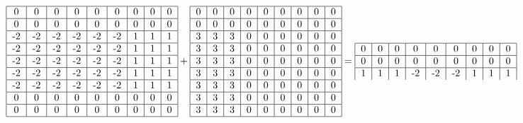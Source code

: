 \documentclass{article}
\begin{document}
\begin{equation}
    \begin{tabular}{ | c | c | c | c | c | c | c | c | c | }
        \hline
        0 & 0 & 0 & 0 & 0 & 0 & 0 & 0 & 0 \\ 
        \hline
        0 & 0 & 0 & 0 & 0 & 0 & 0 & 0 & 0 \\ 
        \hline
        -2 & -2 & -2 & -2 & -2 & -2 & 1 & 1 & 1 \\ 
        \hline
        -2 & -2 & -2 & -2 & -2 & -2 & 1 & 1 & 1 \\ 
        \hline
        -2 & -2 & -2 & -2 & -2 & -2 & 1 & 1 & 1 \\ 
        \hline
        -2 & -2 & -2 & -2 & -2 & -2 & 1 & 1 & 1 \\ 
        \hline
        -2 & -2 & -2 & -2 & -2 & -2 & 1 & 1 & 1 \\ 
        \hline
        0 & 0 & 0 & 0 & 0 & 0 & 0 & 0 & 0 \\ 
        \hline
        0 & 0 & 0 & 0 & 0 & 0 & 0 & 0 & 0 \\ 
        \hline
    \end{tabular} + 
    \begin{tabular}{ | c | c | c | c | c | c | c | c | c | }
        \hline
        0 & 0 & 0 & 0 & 0 & 0 & 0 & 0 & 0 \\ 
        \hline
        0 & 0 & 0 & 0 & 0 & 0 & 0 & 0 & 0 \\ 
        \hline
        3 & 3 & 3 & 0 & 0 & 0 & 0 & 0 & 0 \\ 
        \hline
        3 & 3 & 3 & 0 & 0 & 0 & 0 & 0 & 0 \\ 
        \hline
        3 & 3 & 3 & 0 & 0 & 0 & 0 & 0 & 0 \\ 
        \hline
        3 & 3 & 3 & 0 & 0 & 0 & 0 & 0 & 0 \\ 
        \hline
        3 & 3 & 3 & 0 & 0 & 0 & 0 & 0 & 0 \\ 
        \hline
        3 & 3 & 3 & 0 & 0 & 0 & 0 & 0 & 0 \\ 
        \hline
        3 & 3 & 3 & 0 & 0 & 0 & 0 & 0 & 0 \\ 
        \hline
    \end{tabular} = 
    \begin{tabular}{ | c | c | c | c | c | c | c | c | c | }
        \hline
        0 & 0 & 0 & 0 & 0 & 0 & 0 & 0 & 0 \\ 
        \hline
        0 & 0 & 0 & 0 & 0 & 0 & 0 & 0 & 0 \\ 
        \hline
        1 & 1 & 1 & -2 & -2 & -2 & 1 & 1 & 1 \\ 

\end{tabular}
\end{equation}
\end{document}
